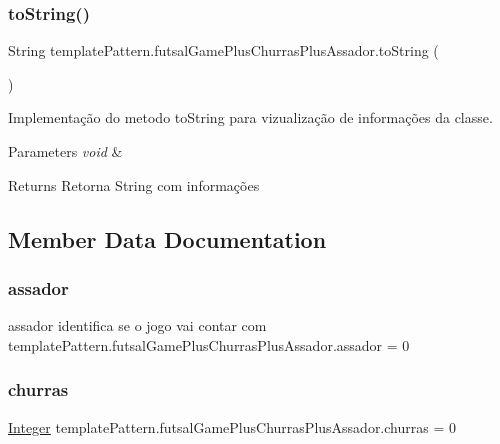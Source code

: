 \subsubsection{\texorpdfstring{toString()}{toString()}}
{\footnotesize\ttfamily String template\+Pattern.\+futsal\+Game\+Plus\+Churras\+Plus\+Assador.\+to\+String (\begin{DoxyParamCaption}{ }\end{DoxyParamCaption})}



Implementação do metodo to\+String para vizualização de informações da classe. 


\begin{DoxyParams}{Parameters}
{\em void} & \\
\hline
\end{DoxyParams}
\begin{DoxyReturn}{Returns}
Retorna String com informações 
\end{DoxyReturn}


\subsection{Member Data Documentation}
\mbox{\label{classtemplate_pattern_1_1futsal_game_plus_churras_plus_assador_a8c1097508a52a6a2ed736caab27fe203}} 
\subsubsection{\texorpdfstring{assador}{assador}}
{\footnotesize\ttfamily assador identifica se o jogo vai contar com template\+Pattern.\+futsal\+Game\+Plus\+Churras\+Plus\+Assador.\+assador = 0}

\mbox{\label{classtemplate_pattern_1_1futsal_game_plus_churras_plus_assador_ac15f470ea19e82ba5acc41b6331d0b23}} 
\subsubsection{\texorpdfstring{churras}{churras}}
{\footnotesize\ttfamily \mbox{\hyperlink{classtemplate_pattern_1_1futsal_game_plus_churras_plus_assador_ab83f78e9dcaac489f5ea3877c4ae8945}{Integer}} template\+Pattern.\+futsal\+Game\+Plus\+Churras\+Plus\+Assador.\+churras = 0}

